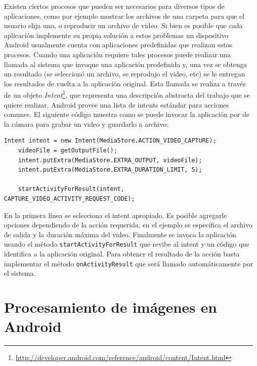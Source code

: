 Existen ciertos procesos que pueden ser necesarios para diversos tipos de aplicaciones, como por ejemplo mostrar los archivos de una carpeta para que el usuario elija uno, o reproducir un archivo de video. Si bien es posible que cada aplicación implemente su propia solución a estos problemas un dispositivo Android usualmente cuenta con aplicaciones predefinidas que realizan estos procesos. Cuando una aplicación requiere tales procesos puede realizar una llamada al sistema que invoque una aplicación predefinida y, una vez se obtenga un resultado (se seleccionó un archivo, se reprodujo el video, etc) se le entregan los resultados de vuelta a la aplicación original. Esta llamada se realiza a través de un objeto \emph{Intent}\footnote{\url{http://developer.android.com/reference/android/content/Intent.html}}, que representa una descripción abstracta del trabajo que se quiere realizar. Android provee una lista de intents estándar para acciones comunes. 
El siguiente código muestra como se puede invocar la aplicación por de la cámara para grabar un video y guardarlo a archivo:
\begin{lstlisting}[style=JavaInputStyle]
    Intent intent = new Intent(MediaStore.ACTION_VIDEO_CAPTURE);
    videoFile = getOutputFile();
    intent.putExtra(MediaStore.EXTRA_OUTPUT, videoFile);
    intent.putExtra(MediaStore.EXTRA_DURATION_LIMIT, 5);

    startActivityForResult(intent, CAPTURE_VIDEO_ACTIVITY_REQUEST_CODE);
\end{lstlisting}


En la primera línea se selecciona el intent apropiado. Es posible agregarle opciones dependiendo de la acción requerida, en el ejemplo se especifica el archivo de salida y la duración máxima del video. Finalmente se invoca la aplicación usando el método \texttt{startActivityForResult} que revibe al intent y un código que identifica a la aplicación original. Para obtener el resultado de la acción basta implementar el método \texttt{onActivityResult} que será llamado automáticamente por el sistema.  

\section{Procesamiento de imágenes en Android}\label{img_proc}


